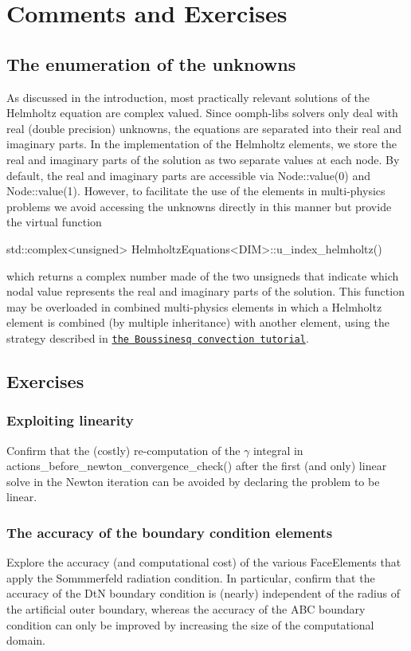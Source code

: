 \hypertarget{index_comm_ex}{}\section{Comments and Exercises}\label{index_comm_ex}
\hypertarget{index_numbering}{}\subsection{The enumeration of the unknowns}\label{index_numbering}
As discussed in the introduction, most practically relevant solutions of the Helmholtz equation are complex valued. Since {\ttfamily oomph-\/lib\textquotesingle{}s} solvers only deal with real (double precision) unknowns, the equations are separated into their real and imaginary parts. In the implementation of the Helmholtz elements, we store the real and imaginary parts of the solution as two separate values at each node. By default, the real and imaginary parts are accessible via {\ttfamily Node\+::value(0)} and {\ttfamily Node\+::value(1)}. However, to facilitate the use of the elements in multi-\/physics problems we avoid accessing the unknowns directly in this manner but provide the virtual function 
\begin{DoxyCode}
std::complex<unsigned> HelmholtzEquations<DIM>::u\_index\_helmholtz()
\end{DoxyCode}
 which returns a complex number made of the two unsigneds that indicate which nodal value represents the real and imaginary parts of the solution. This function may be overloaded in combined multi-\/physics elements in which a Helmholtz element is combined (by multiple inheritance) with another element, using the strategy described in \href{../../../multi_physics/b_convection/html/index.html}{\tt the Boussinesq convection tutorial}.



\hypertarget{index_ex}{}\subsection{Exercises}\label{index_ex}
\hypertarget{index_lin}{}\subsubsection{Exploiting linearity}\label{index_lin}
Confirm that the (costly) re-\/computation of the $ \gamma $ integral in {\ttfamily actions\+\_\+before\+\_\+newton\+\_\+convergence\+\_\+check()} after the first (and only) linear solve in the Newton iteration can be avoided by declaring the problem to be linear.\hypertarget{index_acc}{}\subsubsection{The accuracy of the boundary condition elements}\label{index_acc}
Explore the accuracy (and computational cost) of the various {\ttfamily Face\+Elements} that apply the Sommmerfeld radiation condition. In particular, confirm that the accuracy of the DtN boundary condition is (nearly) independent of the radius of the artificial outer boundary, whereas the accuracy of the A\+BC boundary condition can only be improved by increasing the size of the computational domain.



